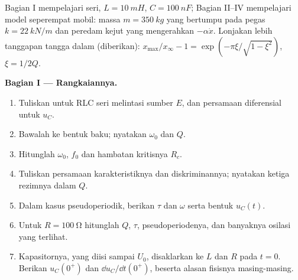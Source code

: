 \begin{problem}
\label{pb:b1:transient-regimes:1}
Bagian I mempelajari  seri, $L = \qty{10}{mH}$, $C = \qty{100}{nF}$;
Bagian II--IV mempelajari model seperempat mobil: massa $m = \qty{350}{kg}$
yang bertumpu pada pegas $k = \qty{22}{kN/m}$ dan peredam kejut yang
mengerahkan $-\alpha\dot x$. Lonjakan lebih tanggapan tangga dalam  (diberikan):
$x_{\max}/x_\infty - 1 = \exp(-\pi\xi/\sqrt{1 - \xi^2})$, $\xi = 1/2Q$.

\medskip
\noindent\textbf{Bagian I --- Rangkaiannya.}
\begin{enumerate}
  \item Tuliskan  untuk RLC seri melintasi sumber $E$, dan
        persamaan diferensial untuk $u_C$.
  \item Bawalah ke bentuk baku; nyatakan $\omega_0$ dan $Q$.
  \item Hitunglah $\omega_0$, $f_0$ dan hambatan kritisnya $R_c$.
  \item Tuliskan persamaan karakteristiknya dan diskriminannya; nyatakan
        ketiga rezimnya dalam $Q$.
  \item Dalam kasus pseudoperiodik, berikan $\tau$ dan $\omega$ serta
        bentuk $u_C(t)$.
  \item Untuk $R = \qty{100}{\ohm}$ hitunglah $Q$, $\tau$,
        pseudoperiodenya, dan banyaknya osilasi yang terlihat.
  \item Kapasitornya, yang diisi sampai $U_0$, disaklarkan ke $L$ dan $R$
        pada $t = 0$. Berikan $u_C(0^+)$ dan $\dd u_C/\dd t(0^+)$,
        beserta alasan fisisnya masing-masing.
\end{enumerate}


\end{problem}
